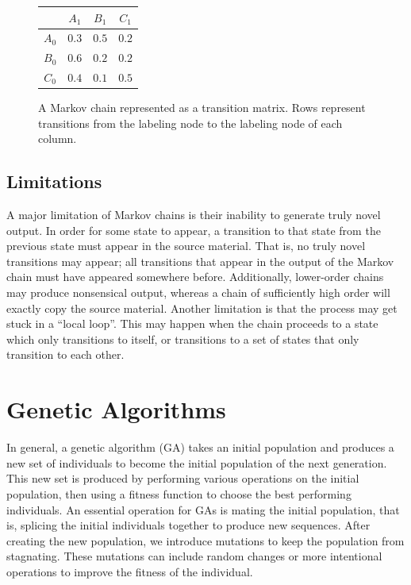 \begin{figure}[h]
	\centering
	\begin{tabular}{c | c c c}
		& $A_{1}$ & $B_{1}$ & $C_{1}$\\
		\hline
		$A_{0}$ & $0.3$ & $0.5$ & $0.2$\\
		$B_{0}$ & $0.6$ & $0.2$ & $0.2$\\
		$C_{0}$ & $0.4$ & $0.1$ & $0.5$
	\end{tabular}
	\caption[A Markov chain represented as a transition matrix.]{A Markov chain represented as a transition matrix. Rows represent transitions from the labeling node to the labeling node of each column.}
	\label{fig:markovMatrix}
\end{figure}

\subsection{Limitations} \label{bg:markov:limitations}

A major limitation of Markov chains is their inability to generate truly novel output.
In order for some state to appear, a transition to that state from the previous state must appear in the source material.
That is, no truly novel transitions may appear; all transitions that appear in the output of the Markov chain must have appeared somewhere before.
Additionally, lower-order chains may produce nonsensical output, whereas a chain of sufficiently high order will exactly copy the source material.
Another limitation is that the process may get stuck in a ``local loop''.
This may happen when the chain proceeds to a state which only transitions to itself, or transitions to a set of states that only transition to each other.



\section{Genetic Algorithms} \label{bg:ga}

In general, a genetic algorithm (GA) takes an initial population and produces a new set of individuals to become the initial population of the next generation.
This new set is produced by performing various operations on the initial population, then using a fitness function to choose the best performing individuals.
An essential operation for GAs is mating the initial population, that is, splicing the initial individuals together to produce new sequences.
After creating the new population, we introduce mutations to keep the population from stagnating.
These mutations can include random changes or more intentional operations to improve the fitness of the individual.

